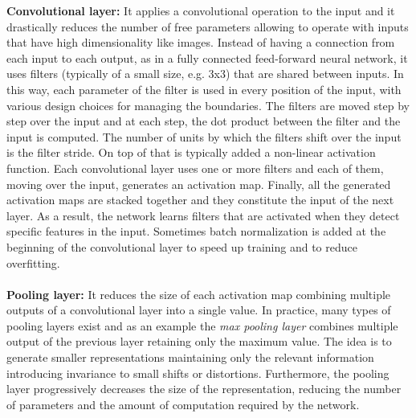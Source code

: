 \begin{figure}[ht]
    \centering
    
%    
    \label{fig:network_architecture_example}
\end{figure}
\noindent
\textbf{Convolutional layer:} It applies a convolutional operation to the input and it drastically reduces the number of free parameters allowing to operate with inputs that have high dimensionality like images. Instead of having a connection from each input to each output, as in a fully connected feed-forward neural network, it uses filters (typically of a small size, e.g. 3x3) that are shared between inputs. In this way, each parameter of the filter is used in every position of the input, with various design choices for managing the boundaries. The filters are moved step by step over the input and at each step, the dot product between the filter and the input is computed. The number of units by which the filters shift over the input is the filter stride. On top of that is typically added a non-linear activation function. Each convolutional layer uses one or more filters and each of them, moving over the input, generates an activation map. Finally, all the generated activation maps are stacked together and they constitute the input of the next layer. As a result, the network learns filters that are activated when they detect specific features in the input. Sometimes batch normalization is added at the beginning of the convolutional layer to speed up training and to reduce overfitting. \\ \\
\textbf{Pooling layer:} It reduces the size of each activation map combining multiple outputs of a convolutional layer into a single value. In practice, many types of pooling layers exist and as an example the \textit{max pooling layer} combines multiple output of the previous layer retaining only the maximum value. The idea is to generate smaller representations maintaining only the relevant information introducing invariance to small shifts or distortions. Furthermore, the pooling layer progressively decreases the size of the representation, reducing the number of parameters and the amount of computation required by the network.\\ \\

